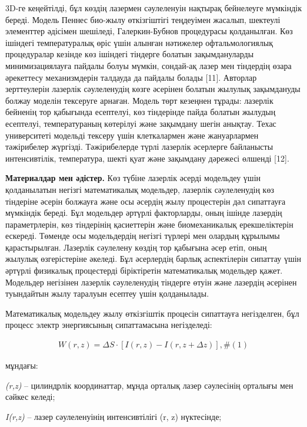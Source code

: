 3D-ге кеңейтілді, бұл көздің лазермен сәулеленуін нақтырақ бейнелеуге
мүмкіндік береді. Модель Пеннес био-жылу өткізгіштігі теңдеуімен
жасалып, шектеулі элементтер әдісімен шешіледі, Галеркин-Бубнов
процедурасы қолданылған. Көз ішіндегі температуралық өріс үшін алынған
нәтижелер офтальмологиялық процедуралар кезінде көз ішіндегі тіндерге
болатын зақымдануларды минимизациялауға пайдалы болуы мүмкін, сондай-ақ
лазер мен тіндердің өзара әрекеттесу механизмдерін талдауда да пайдалы
болады {[}11{]}. Авторлар зерттеулерін лазерлік сәулеленудің көзге
әсерінен болатын жылулық зақымдануды болжау моделін тексеруге арнаған.
Модель төрт кезеңнен тұрады: лазерлік бейненің тор қабығында есептелуі,
көз тіндерінде пайда болатын жылудың есептелуі, температураның көтерілуі
және зақымдану шегін анықтау. Техас университеті модельді тексеру үшін
клеткалармен және жануарлармен тәжірибелер жүргізді. Тәжірибелерде түрлі
лазерлік әсерлерге байланысты интенсивтілік, температура, шекті қуат
және зақымдану дәрежесі өлшенді {[}12{]}.

{\bfseries Материалдар мен әдістер.} Көз түбіне лазерлік әсерді модельдеу
үшін қолданылатын негізгі математикалық модельдер, лазерлік сәулеленудің
көз тіндеріне әсерін болжауға және осы әсердің жылу процестерін дәл
сипаттауға мүмкіндік береді. Бұл модельдер әртүрлі факторларды, оның
ішінде лазердің параметрлерін, көз тіндерінің қасиеттерін және
биомеханикалық ерекшеліктерін ескереді. Төменде осы модельдердің негізгі
түрлері мен олардың құрылымы қарастырылған. Лазерлік сәулелену көздің
тор қабығына әсер етіп, оның жылулық өзгерістеріне әкеледі. Бұл
әсерлердің барлық аспектілерін сипаттау үшін әртүрлі физикалық
процестерді біріктіретін математикалық модельдер қажет. Модельдер
негізінен лазерлік сәулеленудің тіндерге өтуін және лазердің әсерінен
туындайтын жылу таралуын есептеу үшін қолданылады.

Математикалық модельдеу жылу өткізгіштік процесін сипаттауға
негізделген, бұл процесс электр энергиясының сипаттамасына негізделеді:

\[\begin{array}{r}
W(r,z) = \Delta S \cdot \left\lbrack I(r,z) - I(r,z + \Delta z) \right\rbrack,\#(1)
\end{array}\]

мұндағы:

\emph{(r,z)} -- цилиндрлік координаттар, мұнда орталық лазер сәулесінің
орталығы мен сәйкес келеді;

\emph{I(r,z)} -- лазер сәулеленуінің интенсивтілігі (r, z) нүктесінде;

